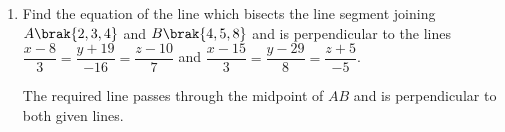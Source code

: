 \begin{enumerate}[label=\thesubsection.\arabic*, ref=\thesubsection.\theenumi]
{Step 2: Symmetry}
\\Suppose
\begin{align}
\brak{a,b}\,R\,\brak{c,d}.
\end{align}
Then, by definition,
\begin{align}
a-c=b-d.
\end{align}
Multiplying both sides by $-1$, we obtain
\begin{align}
c-a=d-b.
\end{align}
Therefore,
\begin{align}
\brak{c,d}\,R\,\brak{a,b}.
\end{align}
Hence, $R$ is symmetric.
\begin{align}
R\text{ is symmetric.}
\end{align}
{Step 3: Transitivity}
\\Suppose
\begin{align}
\brak{a,b}\,R\,\brak{c,d}
\end{align}
and
\begin{align}
\brak{c,d}\,R\,\brak{e,f}.
\end{align}
Then,
\begin{align}
a-c=b-d
\end{align}
and
\begin{align}
c-e=d-f.
\end{align}
Adding these equations, we get
\begin{align}
\brak{a-c}+\brak{c-e}=\brak{b-d}+\brak{d-f}.
\end{align}
Simplifying,
\begin{align}
a-e=b-f.
\end{align}
Therefore,
\begin{align}
\brak{a,b}\,R\,\brak{e,f}.
\end{align}
Hence, $R$ is transitive.
\begin{align}
R\text{ is transitive.}
\end{align}
Since $R$ is reflexive, symmetric, and transitive, it follows that
\begin{align}
R\text{ is an equivalence relation.}
\end{align}

\item
Find the equation of the line which bisects the line segment joining
$A\brak{2,3,4}$ and $B\brak{4,5,8}$ and is perpendicular to the lines
$\dfrac{x-8}{3}=\dfrac{y+19}{-16}=\dfrac{z-10}{7}$ and $\dfrac{x-15}{3}=\dfrac{y-29}{8}=\dfrac{z+5}{-5}$.

\solution
The required line passes through the midpoint of $AB$ and is
perpendicular to both given lines.


\end{enumerate}
